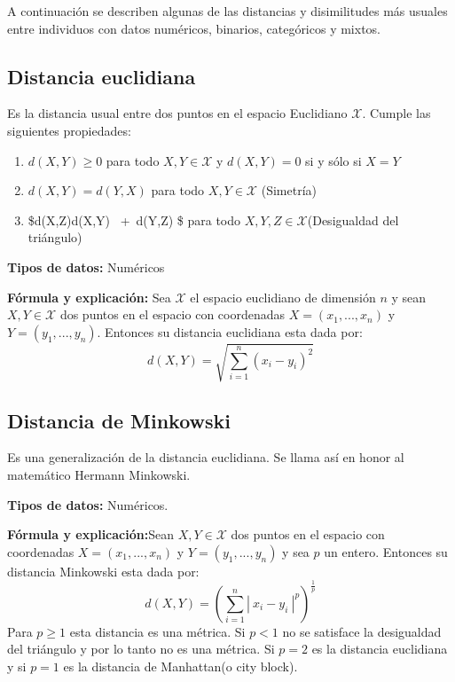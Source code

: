 \documentclass[
]{book}
\providecommand{\tightlist}{%
  \setlength{\itemsep}{0pt}\setlength{\parskip}{0pt}}
\begin{document}
A continuación se describen algunas de las distancias y disimilitudes más usuales entre individuos con datos numéricos, binarios, categóricos y mixtos.

\subsection{Distancia euclidiana}\label{distancia-euclidiana}

Es la distancia usual entre dos puntos en el espacio Euclidiano \(\mathcal{X}\). Cumple las siguientes propiedades:

\begin{enumerate}
\def\labelenumi{\arabic{enumi})}
\tightlist
\item
  \(d(X,Y)\geq 0\) para todo \(X,Y\in \mathcal{X}\) y \(d(X,Y)=0\) si y sólo si \(X=Y\)
\item
  \(d(X,Y)=d(Y,X)\) para todo \(X,Y\in\mathcal{X}\) (Simetría)
\item
  \$d(X,Z)\leq d(X,Y) ~+~d(Y,Z) \$ para todo \(X,Y,Z\in\mathcal{X}\)(Desigualdad del triángulo)
\end{enumerate}

\textbf{Tipos de datos:} Numéricos

\textbf{Fórmula y explicación:} Sea \(\mathcal{X}\) el espacio euclidiano de dimensión \(n\) y sean \(X,Y\in\mathcal{X}\) dos puntos en el espacio con coordenadas \(X=(x_1,...,x_{n})\) y \(Y=(y_{1},...,y_{n})\). Entonces su distancia euclidiana esta dada por:
\[ d(X,Y)=\sqrt{\sum_{i=1}^{n}(x_{i}-y_{i})^{2}}\]

\subsection{Distancia de Minkowski}\label{distancia-de-minkowski}

Es una generalización de la distancia euclidiana. Se llama así en honor al matemático Hermann Minkowski.

\textbf{Tipos de datos:} Numéricos.

\textbf{Fórmula y explicación:}Sean \(X,Y\in\mathcal{X}\) dos puntos en el espacio con coordenadas \(X=(x_1,...,x_{n})\) y \(Y=(y_{1},...,y_{n})\) y sea \(p\) un entero. Entonces su distancia Minkowski esta dada por:
\[ d(X,Y)=\left( \sum_{i=1}^{n} |\ x_{i}-y_{i}\ |^{p}\right)^{\frac{1}{p}}\]
Para \(p\geq 1\) esta distancia es una métrica. Si \(p<1\) no se satisface la desigualdad del triángulo y por lo tanto no es una métrica. Si \(p=2\) es la distancia euclidiana y si \(p=1\) es la distancia de Manhattan(o city block).
\end{document}

